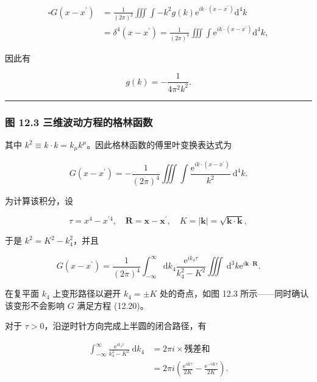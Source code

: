 \[
\begin{aligned}
\square G\left(x-x^{\prime}\right) & =\frac{1}{(2 \pi)^{2}} \iiint \int-k^{2} g(k) \mathrm{e}^{i k \cdot\left(x-x^{\prime}\right)} \mathrm{d}^{4} k \\
& =\delta^{4}\left(x-x^{\prime}\right)=\frac{1}{(2 \pi)^{4}} \iiint \int \mathrm{e}^{i k \cdot\left(x-x^{\prime}\right)} \mathrm{d}^{4} k,
\end{aligned}
\]

因此有

\[
g(k)=-\frac{1}{4 \pi^{2} k^{2}}.
\]

\begin{center}\rule{0.5\linewidth}{0.5pt}\end{center}

\subsubsection{图 12.3
三维波动方程的格林函数}\label{ux56fe-12.3-ux4e09ux7ef4ux6ce2ux52a8ux65b9ux7a0bux7684ux683cux6797ux51fdux6570}

其中
\(k^{2} \equiv k \cdot k = k_{\mu} k^{\mu}\)。因此格林函数的傅里叶变换表达式为

\[
G\left(x-x^{\prime}\right)=-\frac{1}{(2 \pi)^{4}} \iiint \int \frac{\mathrm{e}^{i k \cdot\left(x-x^{\prime}\right)}}{k^{2}} \mathrm{~d}^{4} k.
\]

为计算该积分，设

\[
\tau=x^{4}-x^{\prime 4}, \quad \mathbf{R}=\mathbf{x}-\mathbf{x}^{\prime}, \quad K=|\mathbf{k}|=\sqrt{\mathbf{k} \cdot \mathbf{k}},
\]

于是 \(k^{2}=K^{2}-k_{4}^{2}\)，并且

\[
G\left(x-x^{\prime}\right)=\frac{1}{(2 \pi)^{4}} \int_{-\infty}^{\infty} \mathrm{d} k_{4} \frac{\mathrm{e}^{i k_{4} \tau}}{k_{4}^{2}-K^{2}} \iiint \mathrm{~d}^{3} k \mathrm{e}^{i \mathbf{k} \cdot \mathbf{R}}.
\]

在复平面 \(k_{4}\) 上变形路径以避开 \(k_{4}=\pm K\) 处的奇点，如图 12.3
所示------同时确认该变形不会影响 \(G\) 满足方程 (12.20)。

对于 \(\tau>0\)，沿逆时针方向完成上半圆的闭合路径，有

\[
\begin{aligned}
\int_{-\infty}^{\infty} \frac{\mathrm{e}^{i k_{4} \tau}}{k_{4}^{2}-K^{2}} \mathrm{~d} k_{4} & =2 \pi i \times \text{残差和} \\
& =2 \pi i\left(\frac{\mathrm{e}^{i K \tau}}{2 K}-\frac{\mathrm{e}^{-i K \tau}}{2 K}\right).
\end{aligned}
\]

